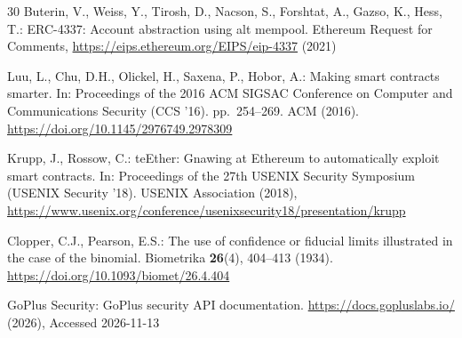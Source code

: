 \documentclass[runningheads]{llncs}
\begin{document}
\begin{thebibliography}{30}
Buterin, V., Weiss, Y., Tirosh, D., Nacson, S., Forshtat, A., Gazso, K., Hess, T.: ERC-4337: Account abstraction using alt mempool. Ethereum Request for Comments, \url{https://eips.ethereum.org/EIPS/eip-4337} (2021)

Luu, L., Chu, D.H., Olickel, H., Saxena, P., Hobor, A.: Making smart contracts smarter. In: Proceedings of the 2016 ACM SIGSAC Conference on Computer and Communications Security (CCS '16). pp.~254--269. ACM (2016). \url{https://doi.org/10.1145/2976749.2978309}

Krupp, J., Rossow, C.: teEther: Gnawing at Ethereum to automatically exploit smart contracts. In: Proceedings of the 27th USENIX Security Symposium (USENIX Security '18). USENIX Association (2018), \url{https://www.usenix.org/conference/usenixsecurity18/presentation/krupp}

Clopper, C.J., Pearson, E.S.: The use of confidence or fiducial limits illustrated in the case of the binomial. Biometrika \textbf{26}(4), 404--413 (1934). \url{https://doi.org/10.1093/biomet/26.4.404}

GoPlus Security: GoPlus security API documentation. \url{https://docs.gopluslabs.io/} (2026), Accessed 2026-11-13

\end{thebibliography}
\end{document}
